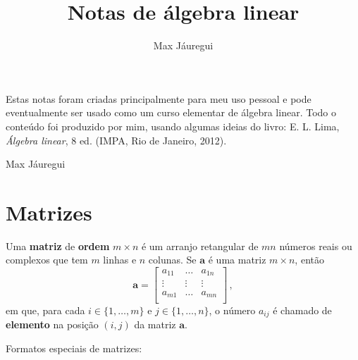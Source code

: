\documentclass[12pt,a4paper]{report}
\title{Notas de álgebra linear}
\author{Max Jáuregui}
\newcommand{\tb}{\textbf}
\newcommand{\mb}{\mathbf}
\begin{document}
\maketitle
  Estas notas foram criadas principalmente para meu uso pessoal e pode eventualmente ser usado como um curso elementar de álgebra linear. Todo o conteúdo foi produzido por mim, usando algumas ideias do livro: E. L. Lima, \textit{Álgebra linear}, 8 ed. (IMPA, Rio de Janeiro, 2012).

  \begin{flushright}
    Max Jáuregui
  \end{flushright}
\tableofcontents

\chapter{Matrizes}

Uma \tb{matriz} de \tb{ordem} $m\times n$ é um arranjo retangular de $mn$ números reais ou complexos que tem $m$ linhas e $n$ colunas. Se $\mb{a}$ é uma matriz $m\times n$, então
$$\mb{a}=\begin{bmatrix}
  a_{11}&\ldots&a_{1n}\\
  \vdots&\vdots&\vdots\\
  a_{m1}&\ldots&a_{mn}\\
\end{bmatrix}\,,$$
em que, para cada $i\in\{1,\ldots,m\}$ e $j\in\{1,\ldots,n\}$, o número $a_{ij}$ é chamado de \tb{elemento} na posição $(i,j)$ da matriz $\mb{a}$.

Formatos especiais de matrizes:
\end{document}
